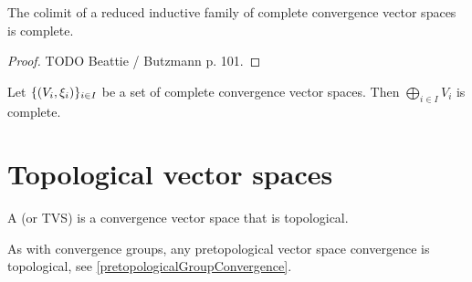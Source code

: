 \begin{proposition}
The colimit of a reduced inductive family of complete convergence vector spaces is complete.
\end{proposition}
\begin{proof}
TODO Beattie / Butzmann p. 101.
\end{proof}
\begin{corollary}
Let $\{\sSet{V_i, \xi_i}\}_{i\in I}$ be a set of complete convergence vector spaces. Then $\bigoplus_{i\in I}V_i$ is complete.
\end{corollary}




\section{Topological vector spaces}
\begin{definition}
A  (or TVS) is a convergence vector space that is topological.
\end{definition}
As with convergence groups, any pretopological vector space convergence is topological, see \ref{pretopologicalGroupConvergence}.

